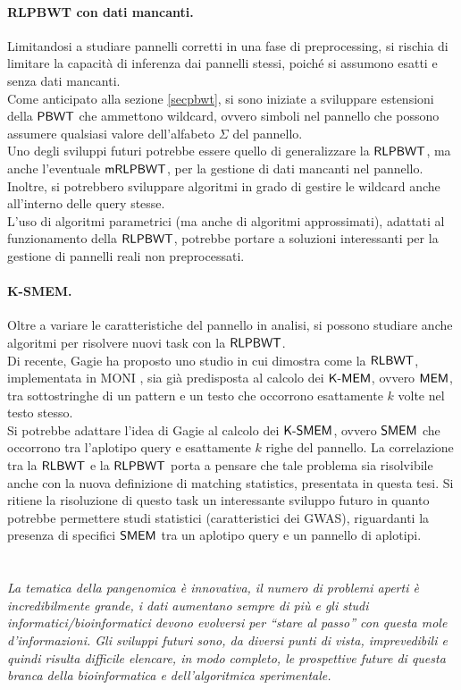 \paragraph{RLPBWT con dati mancanti.}
Limitandosi a studiare pannelli corretti in una fase di
preprocessing, si rischia di limitare la capacità di inferenza dai pannelli
stessi, poiché si assumono esatti e senza dati mancanti.\\ 
Come anticipato alla sezione \ref{secpbwt}, si sono iniziate a sviluppare
estensioni della $\mbox{\rm {\sf PBWT}}$ che ammettono wildcard, ovvero simboli nel
pannello che possono assumere qualsiasi valore dell'alfabeto $\Sigma$ del
pannello.\\
Uno degli sviluppi futuri potrebbe essere quello di generalizzare la
$\mbox{\rm {\sf RLPBWT}}$, ma anche l'eventuale $\mbox{\rm {\sf mRLPBWT}}$, per la gestione di dati
mancanti nel pannello. Inoltre, si potrebbero sviluppare algoritmi in grado di
gestire le wildcard anche all'interno delle query stesse.\\
L'uso di algoritmi parametrici (ma anche
di algoritmi approssimati), adattati al
funzionamento della $\mbox{\rm {\sf RLPBWT}}$, potrebbe portare a soluzioni interessanti
per la gestione di pannelli reali non preprocessati.
\paragraph{K-SMEM.}
Oltre a variare le caratteristiche del pannello in analisi,
si possono studiare anche algoritmi per risolvere nuovi task con la
$\mbox{\rm {\sf RLPBWT}}$.\\ 
Di recente, Gagie \cite{kmems} ha proposto uno studio in cui dimostra come
la $\mbox{\rm {\sf RLBWT}}$, implementata in MONI \cite{moni}, sia già predisposta al
calcolo dei $\mbox{\rm {\sf K-MEM}}$, ovvero $\mbox{\rm {\sf MEM}}$, tra sottostringhe di un
pattern e un testo che occorrono esattamente $k$ volte nel testo stesso.\\
Si potrebbe adattare l'idea di Gagie al calcolo
dei $\mbox{\rm {\sf K-SMEM}}$, ovvero $\mbox{\rm {\sf SMEM}}$ che occorrono tra l'aplotipo query e esattamente
$k$ righe del pannello. La 
correlazione tra la $\mbox{\rm {\sf RLBWT}}$ e la $\mbox{\rm {\sf RLPBWT}}$ 
porta a pensare che tale problema sia risolvibile anche con la nuova definizione
di matching statistics, presentata in questa tesi.
Si ritiene la risoluzione di questo task
un interessante sviluppo futuro in quanto potrebbe permettere studi statistici
(caratteristici dei GWAS),
riguardanti la presenza di specifici $\mbox{\rm {\sf SMEM}}$ tra un aplotipo query e un pannello
di aplotipi.\\
\\
\\
\textit{La tematica della pangenomica è innovativa, il numero di
problemi aperti è incredibilmente grande, i dati aumentano sempre di più e gli
studi informatici/bioinformatici devono evolversi per ``stare al passo'' con
questa mole 
d'informazioni. Gli sviluppi futuri sono, da diversi punti di vista,
imprevedibili e quindi risulta difficile elencare, in modo completo, le
prospettive future di questa branca della bioinformatica e dell'algoritmica
sperimentale.}
